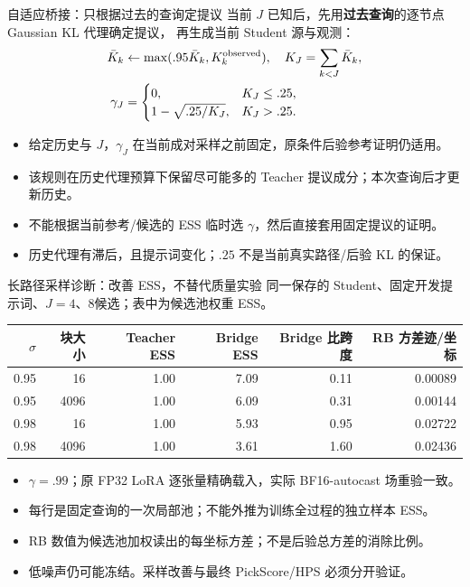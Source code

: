 \documentclass[10pt,aspectratio=169]{beamer}
\begin{document}
\begin{frame}{自适应桥接：只根据过去的查询定提议}
\small
当前 $J$ 已知后，先用\textbf{过去查询}的逐节点 Gaussian KL 代理确定提议，
再生成当前 Student 源与观测：
\begin{align}
\bar K_k&\leftarrow\max(.95\bar K_k,K_k^{\rm observed}),\quad
K_J=\sum_{k<J}\bar K_k,\\
\gamma_J&=\begin{cases}0,&K_J\leq .25,\\1-\sqrt{.25/K_J},&K_J>.25.\end{cases}
\end{align}
\begin{itemize}\itemsep5pt
\item 给定历史与 $J$，$\gamma_J$ 在当前成对采样之前固定，原条件后验参考证明仍适用。
\item 该规则在历史代理预算下保留尽可能多的 Teacher 提议成分；本次查询后才更新历史。
\item 不能根据当前参考/候选的 ESS 临时选 $\gamma$，然后直接套用固定提议的证明。
\item 历史代理有滞后，且提示词变化；$.25$ 不是当前真实路径/后验 KL 的保证。
\end{itemize}
\end{frame}
\begin{frame}{长路径采样诊断：改善 ESS，不替代质量实验}
\footnotesize\centering
同一保存的 Student、固定开发提示词、$J=4$、8候选；表中为候选池权重 ESS。
\begin{tabular}{rrrrrr}\toprule
$\sigma$ & 块大小 & Teacher ESS & Bridge ESS & Bridge 比跨度 & RB 方差迹/坐标\\\midrule
0.95 & 16 & 1.00 & 7.09 & 0.11 & 0.00089 \\
0.95 & 4096 & 1.00 & 6.09 & 0.31 & 0.00144 \\
0.98 & 16 & 1.00 & 5.93 & 0.95 & 0.02722 \\
0.98 & 4096 & 1.00 & 3.61 & 1.60 & 0.02436 \\
\bottomrule\end{tabular}\par\raggedright\vspace{5pt}
\begin{itemize}\itemsep5pt
\item $\gamma=.99$；原 FP32 LoRA 逐张量精确载入，实际 BF16-autocast 场重验一致。
\item 每行是固定查询的一次局部池；不能外推为训练全过程的独立样本 ESS。
\item RB 数值为候选池加权读出的每坐标方差；不是后验总方差的消除比例。
\item 低噪声仍可能冻结。采样改善与最终 PickScore/HPS 必须分开验证。
\end{itemize}
\end{frame}
\end{document}
